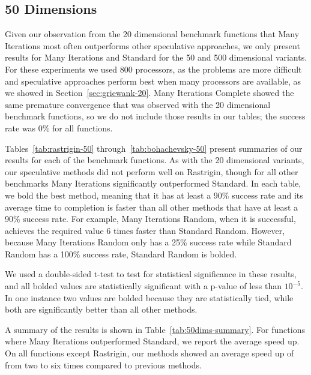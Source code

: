 \documentclass[smallcondensed]{svjour3}
\renewcommand{\sec}[1]{Section~\ref{sec:#1}}
\newcommand{\tabref}[1]{Table~\ref{tab:#1}}
\begin{document}
\subsection{50 Dimensions}
\label{sec:50dims}

Given our observation from the 20 dimensional benchmark functions that Many
Iterations most often outperforms other speculative approaches, we only present
results for Many Iterations and Standard for the 50 and 500 dimensional
variants.  For these experiments we used 800 processors, as the problems are
more difficult and speculative approaches perform best when many processors are
available, as we showed in \sec{griewank-20}.  Many Iterations Complete showed
the same premature convergence that was observed with the 20 dimensional
benchmark functions, so we do not include those results in our tables; the
success rate was 0\% for all functions.

Tables~\ref{tab:rastrigin-50} through~\ref{tab:bohachevsky-50} present
summaries of our results for each of the benchmark functions. As with the 20
dimensional variants, our speculative methods did not perform well on
Rastrigin, though for all other benchmarks Many Iterations significantly
outperformed Standard.  In each table, we bold the best method, meaning that it
has at least a 90\% success rate and its average time to completion is faster
than all other methods that have at least a 90\% success rate.  For example,
Many Iterations Random, when it is successful, achieves the required value 6
times faster than Standard Random.  However, because Many Iterations Random
only has a 25\% success rate while Standard Random has a 100\% success rate,
Standard Random is bolded.

We used a double-sided t-test to test for statistical significance in these
results, and all bolded values are statistically significant with a p-value of
less than $10^{-5}$.  In one instance two values are bolded because they are
statistically tied, while both are significantly better than all other methods.

A summary of the results is shown in \tabref{50dims-summary}.  For functions
where Many Iterations outperformed Standard, we report the average speed up.
On all functions except Rastrigin, our methods showed an average speed up of
from two to six times compared to previous methods.
\end{document}
